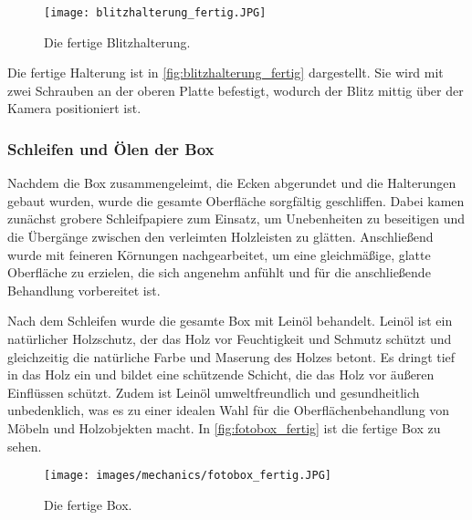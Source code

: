 \newpage

\begin{figure}[H]
    \centering
    \texttt{[image: blitzhalterung\_fertig.JPG]}
    \caption{Die fertige Blitzhalterung.}
    \label{fig:blitzhalterung_fertig}
\end{figure}

Die fertige Halterung ist in \autoref{fig:blitzhalterung_fertig} dargestellt.
Sie wird mit zwei Schrauben an der oberen Platte befestigt, wodurch der Blitz
mittig über der Kamera positioniert ist.

\subsubsection{Schleifen und Ölen der Box}

Nachdem die Box zusammengeleimt, die Ecken abgerundet und die Halterungen
gebaut wurden, wurde die gesamte Oberfläche sorgfältig geschliffen.
Dabei kamen zunächst grobere Schleifpapiere zum Einsatz, um Unebenheiten zu
beseitigen und die Übergänge zwischen den verleimten Holzleisten zu glätten.
Anschließend wurde mit feineren Körnungen nachgearbeitet, um eine gleichmäßige,
glatte Oberfläche zu erzielen, die sich angenehm anfühlt und für die
anschließende Behandlung vorbereitet ist.

Nach dem Schleifen wurde die gesamte Box mit Leinöl behandelt.
Leinöl ist ein natürlicher Holzschutz, der das Holz vor Feuchtigkeit
und Schmutz schützt und gleichzeitig die natürliche Farbe und Maserung des Holzes
betont. Es dringt tief in das Holz ein und bildet eine schützende Schicht,
die das Holz vor äußeren Einflüssen schützt. Zudem ist Leinöl umweltfreundlich
und gesundheitlich unbedenklich, was es zu einer idealen Wahl für die
Oberflächenbehandlung von Möbeln und Holzobjekten macht. In \autoref{fig:fotobox_fertig}
ist die fertige Box zu sehen.


\begin{figure}[H]
    \centering
    \texttt{[image: images/mechanics/fotobox\_fertig.JPG]}
    \caption{Die fertige Box.}
    \label{fig:fotobox_fertig}
\end{figure}